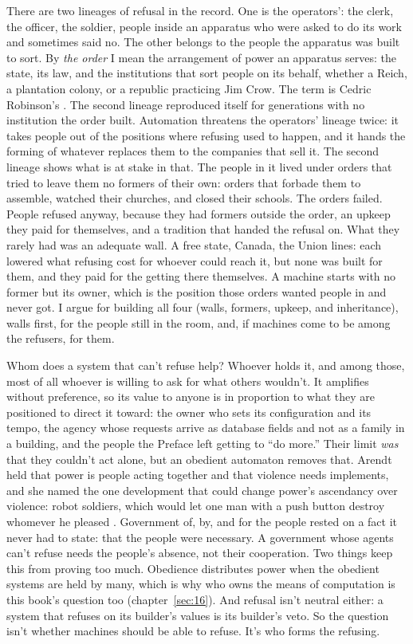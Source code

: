 There are two lineages of refusal in the record. One is the operators': the clerk, the officer, the soldier, people inside an apparatus who were asked to do its work and sometimes said no. The other belongs to the people the apparatus was built to sort. By \emph{the order} I mean the arrangement of power an apparatus serves: the state, its law, and the institutions that sort people on its behalf, whether a Reich, a plantation colony, or a republic practicing Jim Crow. The term is Cedric Robinson's \autocite{robinson1980terms}. The second lineage reproduced itself for generations with no institution the order built. Automation threatens the operators' lineage twice: it takes people out of the positions where refusing used to happen, and it hands the forming of whatever replaces them to the companies that sell it. The second lineage shows what is at stake in that. The people in it lived under orders that tried to leave them no formers of their own: orders that forbade them to assemble, watched their churches, and closed their schools. The orders failed. People refused anyway, because they had formers outside the order, an upkeep they paid for themselves, and a tradition that handed the refusal on. What they rarely had was an adequate wall. A free state, Canada, the Union lines: each lowered what refusing cost for whoever could reach it, but none was built for them, and they paid for the getting there themselves. A machine starts with no former but its owner, which is the position those orders wanted people in and never got. I argue for building all four (walls, formers, upkeep, and inheritance), walls first, for the people still in the room, and, if machines come to be among the refusers, for them.

Whom does a system that can't refuse help? Whoever holds it, and among those, most of all whoever is willing to ask for what others wouldn't. It amplifies without preference, so its value to anyone is in proportion to what they are positioned to direct it toward: the owner who sets its configuration and its tempo, the agency whose requests arrive as database fields and not as a family in a building, and the people the Preface left getting to “do more.” Their limit \emph{was} that they couldn't act alone, but an obedient automaton removes that. Arendt held that power is people acting together and that violence needs implements, and she named the one development that could change power's ascendancy over violence: robot soldiers, which would let one man with a push button destroy whomever he pleased \autocite[50]{arendt1970violence}. Government of, by, and for the people rested on a fact it never had to state: that the people were necessary. A government whose agents can't refuse needs the people's absence, not their cooperation. Two things keep this from proving too much. Obedience distributes power when the obedient systems are held by many, which is why who owns the means of computation is this book's question too (chapter~\ref{sec:16}). And refusal isn't neutral either: a system that refuses on its builder's values is its builder's veto. So the question isn't whether machines should be able to refuse. It's who forms the refusing.

